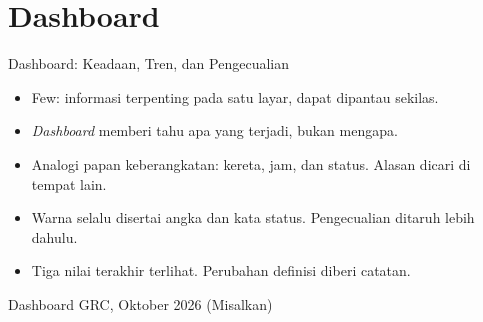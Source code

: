 \documentclass[aspectratio=169, table, 12pt]{beamer}
\begin{document}
\section{Dashboard}

\begin{frame}{{\Large Dashboard: Keadaan, Tren, dan Pengecualian}}
  \vspace{6pt}
  \small
  \begin{itemize}
    \item Few: informasi terpenting pada satu layar, dapat dipantau sekilas.
    \item \textit{Dashboard} memberi tahu apa yang terjadi, bukan mengapa.
    \item Analogi papan keberangkatan: kereta, jam, dan status. Alasan dicari di tempat lain.
    \item Warna selalu disertai angka dan kata status. Pengecualian ditaruh lebih dahulu.
    \item Tiga nilai terakhir terlihat. Perubahan definisi diberi catatan.
  \end{itemize}
\end{frame}

\begin{frame}{{\Large Dashboard GRC, Oktober 2026 (Misalkan)}}
  \vspace{-2pt}
  \begin{center}
    \resizebox{!}{0.72\textheight}{}
  \end{center}
\end{frame}
\end{document}
